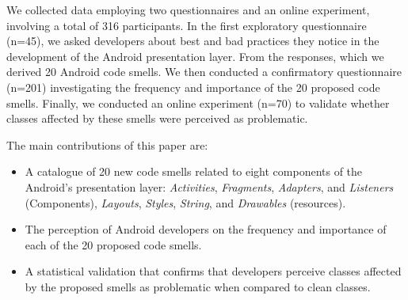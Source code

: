 We collected data employing two questionnaires and an online experiment, involving a total of 316 participants. In the first exploratory questionnaire (n=45), we asked developers about best and bad practices they notice in the development of the Android presentation layer. From the responses, which we derived 20 Android code smells. We then conducted a confirmatory questionnaire (n=201) investigating the frequency and importance of the 20 proposed code smells. Finally, we conducted an online experiment (n=70) to validate whether classes affected by these smells were perceived as problematic.


The main contributions of this paper are:

\begin{itemize}
  \item A catalogue of 20 new code smells related to eight components of the Android's presentation layer: \textit{Activities}, \textit{Fragments}, \textit{Adapters}, and \textit{Listeners} (Components), \textit{Layouts}, \textit{Styles}, \textit{String}, and \textit{Drawables} (resources).
  
  \item The perception of Android developers on the frequency and importance of each of the 20 proposed code smells.

  \item A statistical validation that confirms that developers perceive classes affected by the proposed smells as problematic when compared to clean classes.
\end{itemize}
